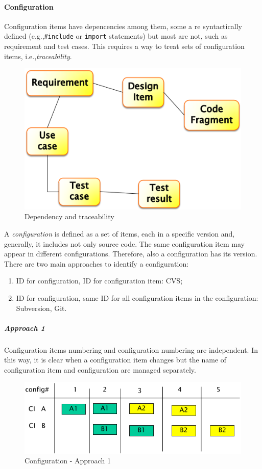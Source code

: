 \paragraph{Configuration}
Configuration items have depencencies among them, some a re syntactically defined (e.g.,\@ \texttt{\#include} or \texttt{import} statements) but most are not, such as requirement and test cases. This requires a way to treat sets of configuration items, i.e.,\@ \emph{traceability}.

\begin{figure}[hbtp]
\centering
\includegraphics[scale=0.3]{images/dependency_traceability.png}
\caption{Dependency and traceability}
\end{figure}

A \emph{configuration} is defined as a set of items, each in a specific version and, generally, it includes not only source code. The same configuration item may appear in different configurations. Therefore, also a configuration has its version. There are two main approaches to identify a configuration:
\begin{enumerate}
\item ID for configuration, ID for configuration item: CVS;
\item ID for configuration, same ID for all configuration items in the configuration: Subversion, Git.
\end{enumerate}

\subparagraph{Approach 1}
Configuration items numbering and configuration numbering are independent. In this way, it is clear when a configuration item changes but the name of configuration item and configuration are managed separately.

\begin{figure}[hbtp]
\centering
\includegraphics[scale=0.3]{images/configuration_approach1.png}
\caption{Configuration - Approach 1}
\end{figure}

